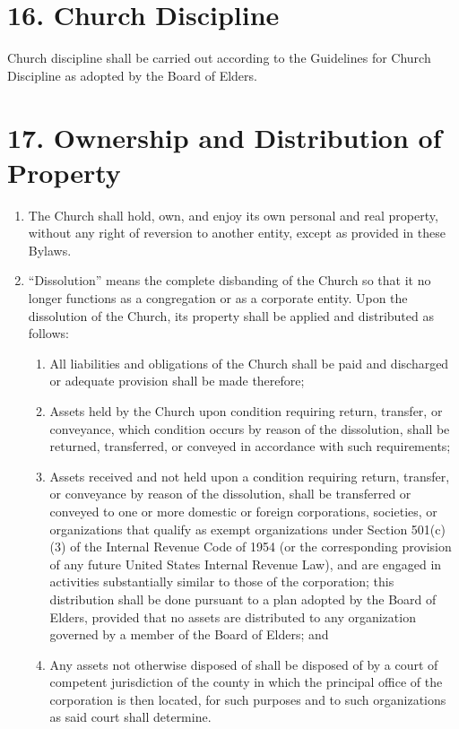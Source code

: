 \documentclass[
]{book}
\providecommand{\tightlist}{%
  \setlength{\itemsep}{0pt}\setlength{\parskip}{0pt}}
\begin{document}
\hypertarget{church-discipline}{%
\section{16. Church Discipline}\label{church-discipline}}

Church discipline shall be carried out according to the Guidelines for Church Discipline as adopted by the Board of Elders.

\hypertarget{ownership-and-distribution-of-property}{%
\section{17. Ownership and Distribution of Property}\label{ownership-and-distribution-of-property}}

\begin{enumerate}
\def\labelenumi{\alph{enumi}.}
\item
  The Church shall hold, own, and enjoy its own personal and real property, without any right of reversion to another entity, except as provided in these Bylaws.
\item
  ``Dissolution'' means the complete disbanding of the Church so that it no longer functions as a congregation or as a corporate entity. Upon the dissolution of the Church, its property shall be applied and distributed as follows:

  \begin{enumerate}
  \def\labelenumii{(\arabic{enumii})}
  \tightlist
  \item
    All liabilities and obligations of the Church shall be paid and discharged or adequate provision shall be made therefore;
  \item
    Assets held by the Church upon con­di­tion requiring return, transfer, or conveyance, which condition occurs by reason of the dissol­ution, shall be returned, transferred, or conveyed in accordance with such requirements;
  \item
    Assets received and not held upon a condition requiring return, transfer, or conveyance by reason of the dissolution, shall be transferred or conveyed to one or more domes­tic or foreign corpora­tions, societies, or organizations that qualify as exempt organiza­tions under Section 501(c)(3) of the Internal Revenue Code of 1954 (or the corresponding provi­sion of any future United States Inter­nal Revenue Law), and are engaged in activities sub­stan­tially similar to those of the corpora­tion; this distribution shall be done pursuant to a plan adopted by the Board of Elders, provided that no assets are distributed to any organ­iza­tion governed by a member of the Board of Elders; and
  \item
    Any assets not other­wise disposed of shall be disposed of by a court of competent jurisdiction of the county in which the principal office of the corporation is then located, for such purposes and to such organizations as said court shall determine.
  \end{enumerate}
\end{enumerate}
\end{document}
